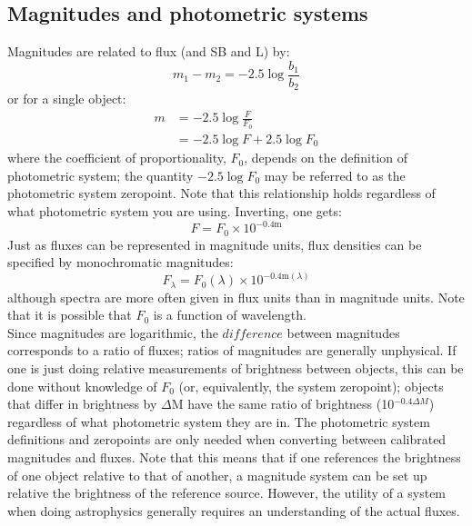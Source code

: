 \documentclass[12pt]{article}
\begin{document}
\subsection*{Magnitudes and photometric systems}
Magnitudes are related to flux (and SB and L) by:
\begin{equation*}
    m_1 - m_2 = -2.5 \log \frac{b_1}{b_2}
\end{equation*}
or for a single object:
\begin{align*}
    m &= -2.5 \log \frac{F}{F_0}\\
      &= -2.5 \log F + 2.5 \log F_0
\end{align*}
where the coefficient of proportionality, $F_0$, depends on the definition
of photometric system; the quantity $-2.5 \log F_0$ may be referred to as
the photometric system zeropoint. Note that this relationship holds
regardless of what photometric system you are using. Inverting, one gets:
\begin{equation*}
    F = F_0 \times 10^{-0.4\textrm{m}}
\end{equation*}
Just as fluxes can be represented in magnitude units, flux densities can be
specified by monochromatic magnitudes:
\begin{equation*}
    F_{\lambda} = F_0 (\lambda) \times 10^{-0.4 \textrm{m}(\lambda)}
\end{equation*}
although spectra are more often given in flux units than in magnitude units.
Note that it is possible that $F_0$ is a function of wavelength.\\

\noindent Since magnitudes are logarithmic, the $difference$ between
magnitudes corresponds to a ratio of fluxes; ratios of magnitudes are
generally unphysical. If one is just doing relative measurements of
brightness between objects, this can be done without knowledge of $F_0$
(or, equivalently, the system zeropoint); objects that differ in brightness
by $\Delta$M have the same ratio of brightness (10$^{-0.4 \Delta M}$)
regardless of what photometric system they are in. The photometric system
definitions and zeropoints are only needed when converting between calibrated
magnitudes and fluxes. Note that this means that if one references the
brightness of one object relative to that of another, a magnitude system
can be set up relative the brightness of the reference source. However, the
utility of a system when doing astrophysics generally requires an
understanding of the actual fluxes.\\
\end{document}
